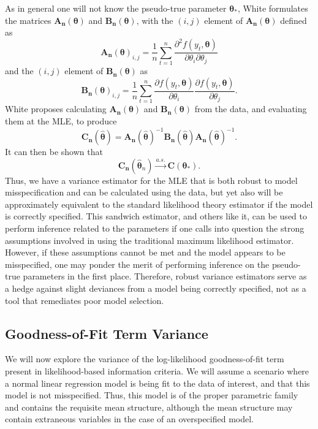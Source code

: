 \documentclass[sn-mathphys-ay]{sn-jnl}
\begin{document}
As in general one will not know the pseudo-true parameter $\bm{\theta}_*$, White formulates the matrices $\bm{A_n}(\bm{\theta})$ and $\bm{B_n}(\bm{\theta})$, with the $(i,j)$ element of $\bm{A_n}(\bm{\theta})$ defined as
\begin{equation*}
	\bm{A_n}(\bm{\theta})_{i,j} = \frac{1}{n} \sum_{t=1}^{n} \frac{\partial^2 f(y_t,\bm{\theta})}{\partial \theta_i \partial \theta_j}
\end{equation*}
and the $(i,j)$ element of $\bm{B_n}(\bm{\theta})$ as
\begin{equation*}
	\bm{B_n}(\bm{\theta})_{i,j} = \frac{1}{n} \sum_{t=1}^{n} \frac{\partial f(y_t,\bm{\theta})}{\partial \theta_i} \frac{\partial f(y_t,\bm{\theta})}{\partial \theta_j} .
\end{equation*}
White proposes calculating $\bm{A_n}(\bm{\theta})$ and $\bm{B_n}(\bm{\theta})$ from the data, and evaluating them at the MLE, to produce
\begin{equation*}
	\bm{C_n}(\hat{\bm{\theta}}) = \bm{A_n}(\hat{\bm{\theta}})^{-1} \bm{B_n}(\hat{\bm{\theta}}) \bm{A_n}(\hat{\bm{\theta}})^{-1} .
\end{equation*}
It can then be shown that 
\begin{equation*}
	\bm{C_n}(\hat{\bm{\theta}}_n) \xrightarrow[]{a.s.} \bm{C}(\bm{\theta}_* ) .
\end{equation*}
Thus, we have a variance estimator for the MLE that is both robust to model misspecification and can be calculated using the data, but yet also will be approximately equivalent to the standard
likelihood theory estimator if the model is correctly specified. This sandwich estimator, and others like it, can be used to perform inference related to the parameters if one calls into question
the strong assumptions involved in using the traditional maximum likelihood estimator. However, if these assumptions cannot be met and the model appears to be misspecified, one may ponder
the merit of performing inference on the pseudo-true parameters in the first place. Therefore, robust variance estimators serve as a hedge against slight deviances from a model
being correctly specified, not as a tool that remediates poor model selection.

\subsection{Goodness-of-Fit Term Variance}
		
		We will now explore the variance of the log-likelihood goodness-of-fit term present in likelihood-based information criteria. We will assume a
		scenario where a normal linear regression model is being fit to the data of interest, and that this model is not misspecified. Thus, this model is of the proper
		parametric family and contains the requisite mean structure, although the mean structure may contain extraneous variables in the
		case of an overspecified model.
\end{document}
